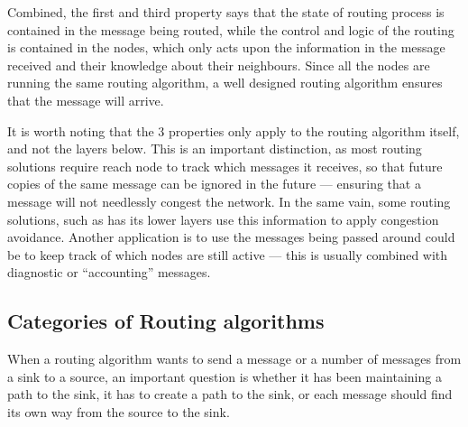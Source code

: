 Combined, the first and third property says that the state of routing process is contained in the message being routed, while the control and logic of the routing is contained in the nodes, which only acts upon the information in the message received and their knowledge about their neighbours. Since all the nodes are running the same routing algorithm, a well designed routing algorithm ensures that the message will arrive.

\label{record-recived}
It is worth noting that the 3 properties only apply to the routing algorithm itself, and not the layers below. This is an important distinction, as most routing solutions require reach node to track which messages it receives, so that future copies of the same message can be ignored in the future --- ensuring that a message will not needlessly congest the network. In the same vain, some routing solutions, such as \cite{speed} has its lower layers use this information to apply congestion avoidance. Another application is to use the messages being passed around could be to keep track of which nodes are still active --- this is usually combined with diagnostic or ``accounting'' messages. 

\subsection{Categories of Routing algorithms}
When a routing algorithm wants to send a message or a number of messages from a sink to a source, an important question is whether it has been maintaining a path to the sink, it has to create a path to the sink, or each message should find its own way from the source to the sink.

